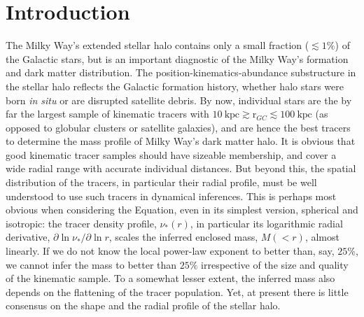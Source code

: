 \documentclass[12pt,preprint]{aastex}
\newcommand{\rgc}{\ensuremath{\mathrm{r}_{GC}}}
\begin{document}
\section{Introduction}\label{sec:Introduction}
The Milky Way's extended stellar halo contains only a small fraction ($\lesssim 1\%$) of the Galactic stars, but is an important diagnostic of the Milky Way's formation and dark matter distribution. The position-kinematics-abundance substructure in the stellar halo reflects the Galactic formation history, whether halo stars were born \textit{in situ} or are disrupted satellite debris. By now, individual stars are the by far the largest sample of
kinematic tracers with
$10~\mathrm{kpc}\gtrsim \rgc\lesssim 100~\mathrm{kpc}$ (as opposed to globular clusters or satellite galaxies), and are hence the best tracers to determine the mass profile of Milky Way's dark matter halo. It is obvious that good kinematic tracer samples should have sizeable membership, and cover a wide radial range with accurate individual distances. But beyond this, the spatial distribution of the tracers, in particular their radial profile, must be well understood to use such tracers in dynamical inferences. This is perhaps most obvious when considering the \citet{Jeans1915} Equation, even in its simplest version, spherical and isotropic: the tracer
density profile, $\nu_* (r)$, in particular its logarithmic radial derivative,
$\partial{\ln \nu_*}/\partial{\ln r}$, scales the inferred enclosed mass, $M(<r)$, almost linearly.
If we do not know the local power-law exponent to better than, say, $25\%$, we cannot
infer the mass to better than $25\%$ irrespective of the size and quality of the kinematic sample. To a somewhat lesser extent, the inferred mass also depends on the flattening of the tracer population. Yet, at present there is little consensus on the shape and the radial profile of the stellar halo.
\end{document}
